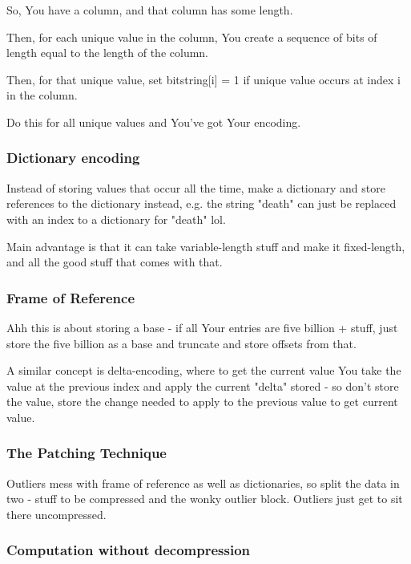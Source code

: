 \documentclass{article}
\begin{document}
			So, You have a column, and that column has some length.
			
			Then, for each unique value in the column, You create a sequence of bits of length equal to the length of the column.
			
			Then, for that unique value, set bitstring[i] = 1 if unique value occurs at index i in the column.
			
			Do this for all unique values and You've got Your encoding.
			
		\subsubsection{Dictionary encoding}
			
			Instead of storing values that occur all the time, make a dictionary and store references to the dictionary instead, e.g. the string "death" can just be replaced with an index to a dictionary for "death" lol.
			
			Main advantage is that it can take variable-length stuff and make it fixed-length, and all the good stuff that comes with that.
			
		\subsubsection{Frame of Reference}
			
			Ahh this is about storing a base - if all Your entries are five billion + stuff, just store  the five billion as a base and truncate and store offsets from that.
			
			A similar concept is delta-encoding, where to get the current value You take the value at the previous index and apply the current "delta" stored - so don't store the value, store the change needed to apply to the previous value to get current value.
			
		\subsubsection{The Patching Technique}
		
			Outliers mess with frame of reference as well as dictionaries, so split the data in two - stuff to be compressed and the wonky outlier block. Outliers just get to sit there uncompressed.
	
		\subsubsection{Computation without decompression}
			
\end{document}
